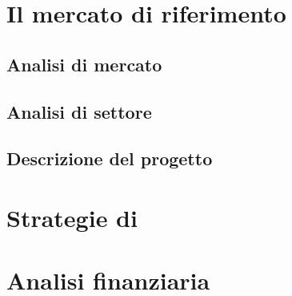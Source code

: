 \clearpage

\section{Il mercato di riferimento}\label{sec:whattheproblemis}
\subsection{Analisi di mercato}

\subsection{Analisi di settore}

\subsection{Descrizione del progetto}

\clearpage

\section{Strategie di \mktg}\label{sec:exitstrategy}

\clearpage

\section{Analisi finanziaria}

